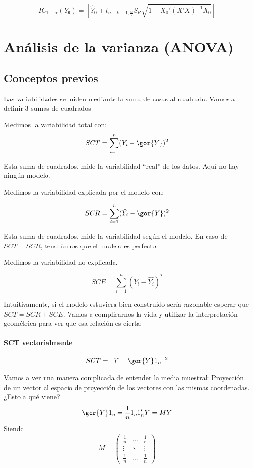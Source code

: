 \[
IC_{1-α}(Y_0)=\left[ \hat{Y}_0 \mp t_{n-k-1;\frac{α}{2}} S_R\sqrt{1+X_0'(X'X)^{-1}X_0} \right]
\]

\section{Análisis de la varianza (ANOVA)}

\subsection{Conceptos previos}
Las variabilidades se miden mediante la suma de cosas al cuadrado. Vamos a definir 3 sumas de cuadrados:

\begin{defn}
Medimos la variabilidad total con:
\[SCT = \sum_{i=1}^n (Y_i - \gor{Y})^2\]

Esta suma de cuadrados, mide la variabilidad ``real'' de los datos. Aquí no hay ningún modelo.
\end{defn}

\begin{defn}
Medimos la variabilidad explicada por el modelo con:

\[SCR = \sum_{i=1}^n (\hat{Y_i} - \gor{Y})^2\]

Esta suma de cuadrados, mide la variabilidad según el modelo. En caso de $SCT = SCR$, tendríamos que el modelo es perfecto.
\end{defn}



\begin{defn}
Medimos la variabilidad no explicada.

\[SCE = \sum_{i=1}^n (Y_i - \hat{Y_i})^2\]

\end{defn}


Intuitivamente, si el modelo estuviera bien construido sería razonable esperar que $SCT = SCR + SCE$.
Vamos a complicarnos la vida y utilizar la interpretación geométrica para ver que esa relación es cierta:


\paragraph{SCT vectorialmente}

\[
SCT = ||Y - \gor{Y}1_n||^2
\]

Vamos a ver una manera complicada de entender la media muestral: Proyección de un vector al espacio de proyección de los vectores con las mismas coordenadas. ¿Esto a qué viene?
\[
\gor{Y}1_n = \frac{1}{n}1_n1'_nY = MY
\]
Siendo \[M = \begin{pmatrix}\frac{1}{n} & ... & \frac{1}{n} \\ \vdots & \ddots & \vdots \\ \frac{1}{n} & ... & \frac{1}{n}\end{pmatrix}\]

